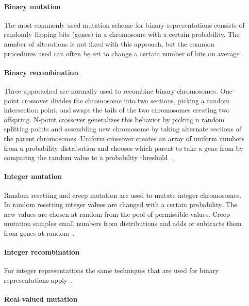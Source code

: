 \paragraph{Binary mutation}

The most commonly used mutation scheme for binary representations consists of randomly flipping bits (genes) in a chromosome with a certain probability. The number of alterations is not fixed with this approach, but the common procedures used can often be set to change a certain number of bits on average~\cite{Eiben201511}.

\paragraph{Binary recombination}

Three approached are normally used to recombine binary chromosomes. One-point crossover divides the chromosome into two sections, picking a random intersection point, and swaps the tails of the two chromosomes creating two offspring. N-point crossover generalizes this behavior by picking n random splitting points and assembling new chromosome by taking alternate sections of the parent chromosomes. Uniform crossover creates an array of uniform numbers from a probability distribution and chooses which parent to take a gene from by comparing the random value to a probability threshold~\cite{Eiben201511}.

\paragraph{Integer mutation}

Random resetting and creep mutation are used to mutate integer chromosomes. In random resetting integer values are changed with a certain probability. The new values are chosen at random from the pool of permissible values. Creep mutation samples small numbers from distributions and adds or subtracts them from genes at random~\cite{Eiben201511}.

\paragraph{Integer recombination}

For integer representations the same techniques that are used for binary representations apply~\cite{Eiben201511}.


\paragraph{Real-valued mutation}

